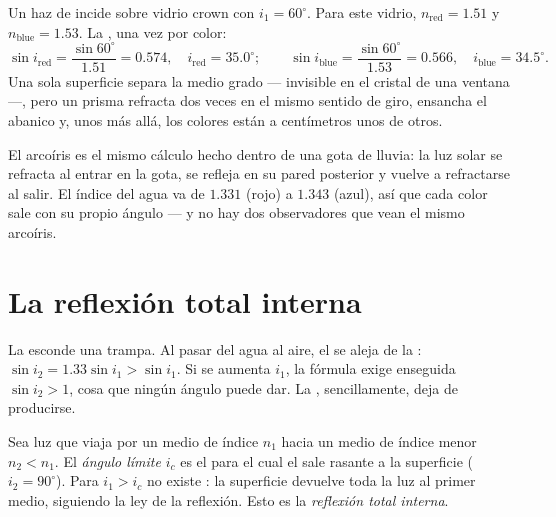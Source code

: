\begin{example}\label{ex:g10:refraction:twocolors}
Un haz de  incide sobre vidrio crown con $i_1 = 60^\circ$.
Para este vidrio, $n_{\text{red}} = 1.51$ y $n_{\text{blue}} = 1.53$. La
, una vez por color:
\[
\sin i_{\text{red}} = \frac{\sin 60^\circ}{1.51} = 0.574,
\quad i_{\text{red}} = 35.0^\circ ;
\qquad
\sin i_{\text{blue}} = \frac{\sin 60^\circ}{1.53} = 0.566,
\quad i_{\text{blue}} = 34.5^\circ .
\]
Una sola superficie separa la  medio grado --- invisible en el
cristal de una ventana ---, pero un prisma refracta dos veces en el
mismo sentido de giro, ensancha el abanico y, unos  más allá, los
colores están a centímetros unos de otros.
\end{example}

\begin{remark}\label{rem:g10:refraction:rainbow}
El arcoíris es el mismo cálculo hecho dentro de una gota de lluvia: la
luz solar se refracta al entrar en la gota, se refleja en su pared
posterior y vuelve a refractarse al salir. El índice del agua va de
$1.331$ (rojo) a $1.343$ (azul), así que cada color sale con su propio
ángulo --- y no hay dos observadores que vean el mismo arcoíris.
\end{remark}

\section{La reflexión total interna}

La  esconde una trampa. Al pasar del agua al aire, el  se aleja de la : $\sin i_2 = 1.33 \sin i_1 > \sin i_1$.
Si se aumenta $i_1$, la fórmula exige enseguida $\sin i_2 > 1$, cosa que
ningún ángulo puede dar. La , sencillamente, deja de
producirse.

\begin{definition}\label{def:g10:refraction:critical}
Sea luz que viaja por un medio de índice $n_1$ hacia un medio de índice
menor $n_2 < n_1$. El \emph{ángulo límite} $i_c$ es
el  para el cual el  sale rasante a
la superficie ($i_2 = 90^\circ$). Para $i_1 > i_c$ no existe : la superficie devuelve toda la luz al primer medio,
siguiendo la ley de la reflexión. Esto es la \emph{reflexión total
interna}.
\end{definition}


